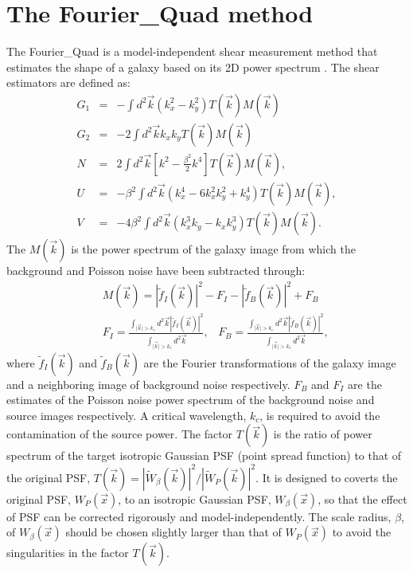 \documentclass[twocolumn]{aastex62}
\begin{document}
\section{The Fourier\_Quad method}\label{sec:FQ}
The Fourier\_Quad is a model-independent shear measurement method that estimates the shape of a galaxy based on its 2D power spectrum \citep{Zhang2008, Zhang2015, Zhang2017}. The shear estimators are defined as:
\begin{eqnarray}
\label{shear_estimator}
G_1&=&-\int d^2\vec{k}(k_x^2-k_y^2)T(\vec{k})M(\vec{k})\\ \nonumber
G_2&=&-2\int d^2\vec{k}k_xk_yT(\vec{k})M(\vec{k})\\ \nonumber
N&=&2\int d^2\vec{k}\left[k^2-\frac{\beta^2}{2}k^4\right]T(\vec{k})M(\vec{k}), \\ \nonumber
U &=& -\beta^2\int d^2\vec{k}(k_x^4 - 6k_x^2k_y^2 + k_y^4)T(\vec{k})M(\vec{k}), \\ \nonumber
V &=& -4\beta^2\int d^2\vec{k}(k_x^3k_y - k_xk_y^3)T(\vec{k})M(\vec{k}).
\end{eqnarray}
The $M(\vec{k})$ is the power spectrum of the galaxy image from which the background and Poisson noise have been subtracted through:
\begin{eqnarray}
\label{FQ_TM}
&&M(\vec{k})=\left\vert\widetilde{f}_I(\vec{k})\right\vert^2-F_I-\left\vert\widetilde{f}_B(\vec{k})\right\vert^2+F_B\\ \nonumber
&&F_I=\frac{\int_{\vert\vec{k}\vert > k_c} d^2\vec{k}\left\vert\widetilde{f}_I(\vec{k})\right\vert^2}{\int_{\vert\vec{k}\vert > k_c} d^2\vec{k}}, \;\;\; F_B=\frac{\int_{\vert\vec{k}\vert > k_c} d^2\vec{k}\left\vert\widetilde{f}_B(\vec{k})\right\vert^2}{\int_{\vert\vec{k}\vert > k_c} d^2\vec{k}},
\end{eqnarray}
where $\widetilde{f}_I(\vec{k})$ and $\widetilde{f}_B(\vec{k})$ are the Fourier transformations of the galaxy image and a neighboring image of background noise respectively. $F_B$ and $F_I$ are the estimates of the Poisson noise power spectrum of the background noise and source images respectively. A critical wavelength, $k_c$, is required to avoid the contamination of the source power\citep{Zhang2015}. The factor $T(\vec{k})$ is the ratio of power spectrum of the target isotropic Gaussian PSF (point spread function) to that of the original PSF, $T(\vec{k}) = |\widetilde{W}_{\beta}(\vec{k})|^2/|\widetilde{W}_{P}(\vec{k})|^2$.
It is designed to coverts the original PSF, $W_{P}(\vec{x})$, to an isotropic Gaussian PSF, $W_{\beta}(\vec{x})$, so that the effect of PSF can be corrected rigorously and model-independently.
The scale radius, $\beta$, of $W_{\beta}(\vec{x})$ should be chosen slightly larger than that of $W_{P}(\vec{x})$ to avoid the singularities in the factor $T(\vec{k})$. 
\end{document}

